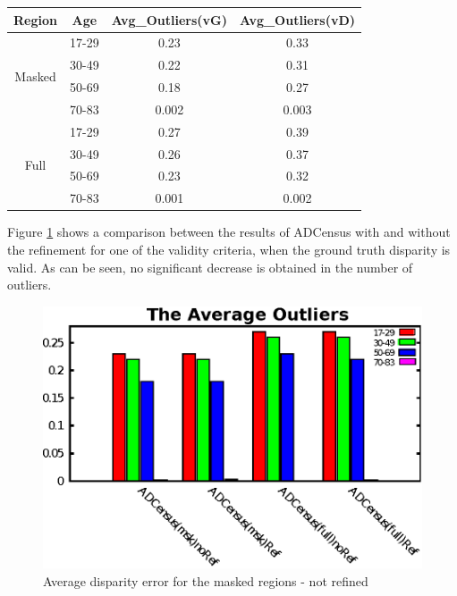 \begin{minipage}{0.8\linewidth}
\begin{center}
\label{tab:adcoutlNref}
\begin{tabular}{ |c|c|c|c| }
\hline
Region & Age &  Avg\_Outliers(vG) & Avg\_Outliers(vD)  \\ \hline
\multirow{4}{*}{Masked} & 17-29 & 0.23 & 0.33 \\
& 30-49 & 0.22 & 0.31 \\
& 50-69 & 0.18 & 0.27 \\
& 70-83 & 0.002 & 0.003 \\ \hline
\multirow{4}{*}{Full} & 17-29 & 0.27 & 0.39 \\
& 30-49 & 0.26 & 0.37 \\
& 50-69 & 0.23 & 0.32 \\
& 70-83 & 0.001 & 0.002 \\ \hline
\end{tabular}
\end{center}
\end{minipage} \newline

Figure \ref{fig:outlnoref} shows a comparison between the results of ADCensus with and without the refinement 
for one of the validity criteria, when the ground truth disparity is valid. As can be seen, no significant decrease is obtained in the number of outliers.

\begin{figure}[H]
\centering
\includegraphics[scale=0.9]{adcrefNoref}
\caption{Average disparity error for the masked regions - not refined}
\label{fig:outlnoref}
\end{figure} 

